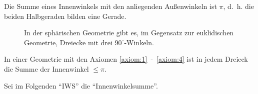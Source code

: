 \begin{beweis}
    Die Summe eines Innenwinkels mit den anliegenden Außenwinkeln ist
    $\pi$, d.~h. die beiden Halbgeraden bilden eine Gerade.
\end{beweis}

\begin{figure}[htp]
    \centering
    
    \caption{In der sphärischen Geometrie gibt es, im Gegensatz zur euklidischen Geometrie, Dreiecke mit drei $90^\circ$-Winkeln.}
    \label{fig:bem.14.9}
\end{figure}

\begin{proposition}\label{prop:14.11}%
    In einer Geometrie mit den Axiomen \ref{axiom:1}~-~\ref{axiom:4}
    ist in jedem Dreieck die Summe der Innenwinkel $\leq \pi$.
\end{proposition}

Sei im Folgenden \enquote{IWS} die \enquote{Innenwinkelsumme}.

